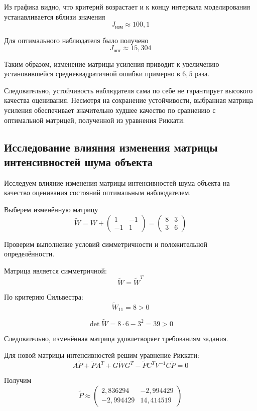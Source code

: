 Из графика видно, что критерий возрастает и к концу
интервала моделирования устанавливается вблизи значения
\[
J_{\text{изм}}\approx100{,}1
\]

Для оптимального наблюдателя было получено
\[
J_{\text{опт}}\approx15{,}304
\]

Таким образом, изменение матрицы усиления приводит
к увеличению установившейся среднеквадратичной ошибки
примерно в $6{,}5$ раза.

Следовательно, устойчивость наблюдателя сама по себе
не гарантирует высокого качества оценивания. Несмотря
на сохранение устойчивости, выбранная матрица усиления
обеспечивает значительно худшее качество по сравнению
с оптимальной матрицей, полученной из уравнения Риккати.


\subsection{Исследование влияния изменения матрицы интенсивностей шума объекта}

Исследуем влияние изменения матрицы интенсивностей шума объекта
на качество оценивания состояний оптимальным наблюдателем.

Выберем изменённую матрицу
\[
\widetilde W=
W+
\begin{pmatrix}
1&-1\\
-1&1
\end{pmatrix}
=
\begin{pmatrix}
8&3\\
3&6
\end{pmatrix}
\]

Проверим выполнение условий симметричности и положительной
определённости.

Матрица является симметричной:
\[
\widetilde W=\widetilde W^T
\]

По критерию Сильвестра:
\[
\widetilde W_{11}=8>0
\]

\[
\det\widetilde W=8\cdot6-3^2=39>0
\]

Следовательно, изменённая матрица удовлетворяет требованиям задания.

Для новой матрицы интенсивностей решим уравнение Риккати:
\[
A\widetilde P+\widetilde PA^T+
G\widetilde WG^T-
\widetilde PC^TV^{-1}C\widetilde P=0
\]

Получим
\[
\widetilde P\approx
\begin{pmatrix}
2{,}836294&-2{,}994429\\
-2{,}994429&14{,}414519
\end{pmatrix}
\]

